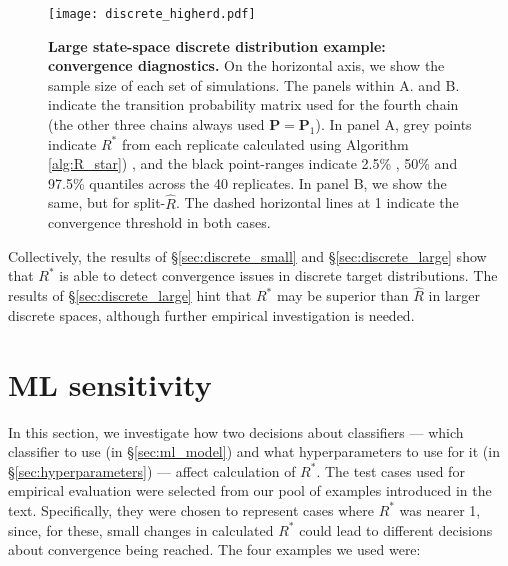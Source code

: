 \documentclass{article}
\begin{document}
\begin{figure}[!htb]
	\centerline{\texttt{[image: discrete\_higherd.pdf]}}
	\caption{\textbf{Large state-space discrete distribution example: convergence diagnostics.} On the horizontal axis, we show the sample size of each set of simulations. The panels within A. and B. indicate the transition probability matrix used for the fourth chain (the other three chains always used $\boldsymbol{P}=\boldsymbol{P}_1$). In panel A, grey points indicate $R^*$ from each replicate calculated using Algorithm \ref{alg:R_star}) , and the black point-ranges indicate 2.5\% , 50\% and 97.5\% quantiles across the 40 replicates. In panel B, we show the same, but for split-$\widehat{R}$. The dashed horizontal lines at 1 indicate the convergence threshold in both cases.}
	\label{fig:discrete_higherd}
\end{figure}

Collectively, the results of \S\ref{sec:discrete_small} and \S\ref{sec:discrete_large} show that $R^*$ is able to detect convergence issues in discrete target distributions. The results of \S\ref{sec:discrete_large} hint that $R^*$ may be superior than $\widehat{R}$ in larger discrete spaces, although further empirical investigation is needed.

\color{black}

\color{red}
\section{ML sensitivity}\label{sec:ML_sensitivity}
In this section, we investigate how two decisions about classifiers — which classifier to use (in \S\ref{sec:ml_model}) and what hyperparameters to use for it (in \S\ref{sec:hyperparameters}) — affect calculation of $R^*$. The test cases used for empirical evaluation were selected from our pool of examples introduced in the text. Specifically, they were chosen to represent cases where $R^*$ was nearer 1, since, for these, small changes in calculated $R^*$ could lead to different decisions about convergence being reached. The four examples we used were:
\end{document}
